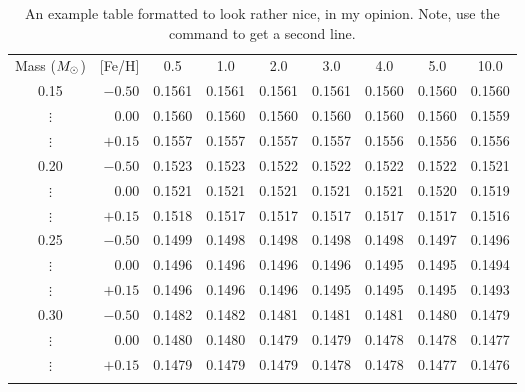 \renewcommand{\arraystretch}{1.25}
\begin{table}[t]
    \begin{center}
        \caption[Example of a simple table]
        {An example table formatted to look rather nice, in my opinion.
        Note, use the \newline command to get a second line.}
        \label{tab:ex1}
        \begin{tabular*}{\linewidth}{@{\extracolsep{\fill}} c r c c c c c c c}
        \hline
        \hline\noalign{\smallskip}
        Mass ($M_{\odot}$) & [Fe/H] & 0.5 & 1.0 & 2.0 & 3.0 & 4.0 & 5.0 & 10.0 \\
        \noalign{\smallskip}\hline\noalign{\smallskip}
        0.15      & $-0.50$ & 0.1561 & 0.1561 & 0.1561 & 0.1561 & 0.1560 & 0.1560 & 0.1560 \\
        $\vdots$  & $ 0.00$ & 0.1560 & 0.1560 & 0.1560 & 0.1560 & 0.1560 & 0.1560 & 0.1559 \\
        $\vdots$  & $+0.15$ & 0.1557 & 0.1557 & 0.1557 & 0.1557 & 0.1556 & 0.1556 & 0.1556 \\
        0.20      & $-0.50$ & 0.1523 & 0.1523 & 0.1522 & 0.1522 & 0.1522 & 0.1522 & 0.1521 \\
        $\vdots$  & $ 0.00$ & 0.1521 & 0.1521 & 0.1521 & 0.1521 & 0.1521 & 0.1520 & 0.1519 \\
        $\vdots$  & $+0.15$ & 0.1518 & 0.1517 & 0.1517 & 0.1517 & 0.1517 & 0.1517 & 0.1516 \\
        0.25      & $-0.50$ & 0.1499 & 0.1498 & 0.1498 & 0.1498 & 0.1498 & 0.1497 & 0.1496 \\
        $\vdots$  & $ 0.00$ & 0.1496 & 0.1496 & 0.1496 & 0.1496 & 0.1495 & 0.1495 & 0.1494 \\
        $\vdots$  & $+0.15$ & 0.1496 & 0.1496 & 0.1496 & 0.1495 & 0.1495 & 0.1495 & 0.1493 \\
        0.30      & $-0.50$ & 0.1482 & 0.1482 & 0.1481 & 0.1481 & 0.1481 & 0.1480 & 0.1479 \\ 
        $\vdots$  & $ 0.00$ & 0.1480 & 0.1480 & 0.1479 & 0.1479 & 0.1478 & 0.1478 & 0.1477 \\
        $\vdots$  & $+0.15$ & 0.1479 & 0.1479 & 0.1479 & 0.1478 & 0.1478 & 0.1477 & 0.1476 \\
        \noalign{\smallskip}\hline
        \end{tabular*}
    \end{center}
\end{table}
